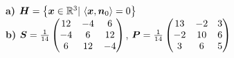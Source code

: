 {\begin{abc}

\end{abc}
}


{
\textbf{ a)} $\Vek H = \bigl\{\Vek x\in \R^3|\, \skalar{\Vek x,\Vek n_0}=0\bigr\}$\\
\textbf{ b)} $\Vek S = \frac 1{14}\begin{pmatrix} 12&-4&6\\-4&6&12\\6&12&-4\end{pmatrix}$, $\Vek P = \frac 1{14} \begin{pmatrix} 13&-2&3\\-2&10&6\\3&6&5\end{pmatrix}$

}
